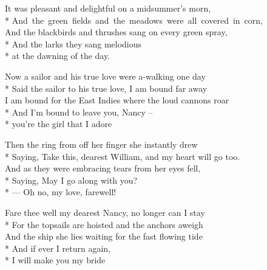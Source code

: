 
\contd
{}

\versemark
It was pleasant and delightful on a midsummer’s morn,\\*
\mbox{And the green fields and the meadows were all covered in corn,}\\
And the blackbirds and thrushes sang on every green spray,\\*
And the larks they sang melodious\\*
\vin at the dawning of the day.

\contd
{}


\versemark
Now a sailor and his true love were a-walking one day\\*
Said the sailor to his true love, I am bound far away\\
I am bound for the East Indies where the loud cannons roar\\*
And I’m bound to leave you, Nancy –\\*
\vin you’re the girl that I adore\simile

\versemark
Then the ring from off her finger she instantly drew\\*
Saying, Take this, dearest William, and my heart will go too.\\
And as they were embracing tears from her eyes fell,\\*
Saying, May I go along with you?\\*
\vin — Oh no, my love, farewell!\simile

\versemark
Fare thee well my dearest Nancy, no longer can I stay\\*
For the topsails are hoisted and the anchors aweigh\\
And the ship she lies waiting for the fast flowing tide\\*
And if ever I return again,\\*
\vin I will make you my bride\simile

